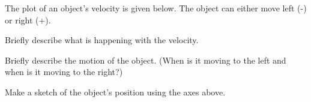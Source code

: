 
\begin{problem}
  \item The plot of an object's velocity is given below. The object
    can either move left (-) or right (+).

  \scalebox{0.7 }{}

    \begin {subproblem}
      \item Briefly describe what is happening with the velocity.
        \vfill

      \item Briefly describe the motion of the object. (When is it
        moving to the left and when is it moving to the right?)
        \vfill

      \item Make a sketch of the object's position using the axes above.
    \end{subproblem}

\end{problem}


